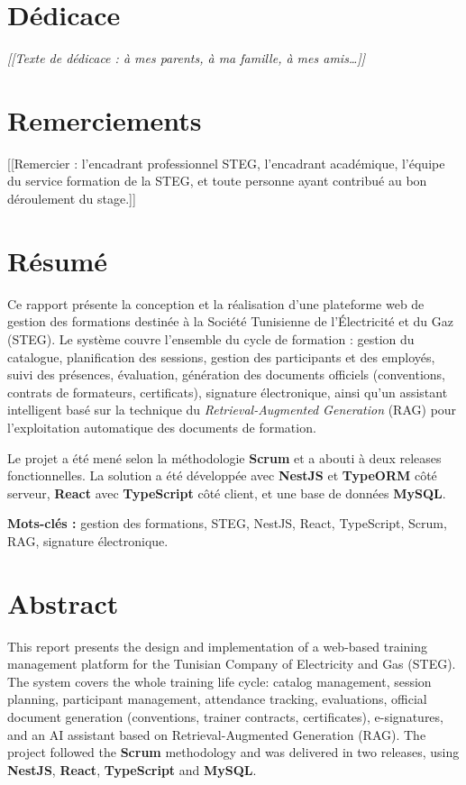 \documentclass[12pt,a4paper]{report}
\begin{document}
\chapter*{Dédicace}
\begin{flushright}
\itshape [[Texte de dédicace : à mes parents, à ma famille, à mes amis\dots]]
\end{flushright}

\chapter*{Remerciements}
[[Remercier : l'encadrant professionnel STEG, l'encadrant académique,
l'équipe du service formation de la STEG, et toute personne ayant contribué
au bon déroulement du stage.]]

\chapter*{Résumé}
Ce rapport présente la conception et la réalisation d'une plateforme web
de gestion des formations destinée à la Société Tunisienne de l'Électricité
et du Gaz (STEG). Le système couvre l'ensemble du cycle de formation :
gestion du catalogue, planification des sessions, gestion des participants
et des employés, suivi des présences, évaluation, génération des documents
officiels (conventions, contrats de formateurs, certificats), signature
électronique, ainsi qu'un assistant intelligent basé sur la technique du
\emph{Retrieval-Augmented Generation} (RAG) pour l'exploitation automatique
des documents de formation.

Le projet a été mené selon la méthodologie \textbf{Scrum} et a abouti à deux
releases fonctionnelles. La solution a été développée avec
\textbf{NestJS} et \textbf{TypeORM} côté serveur, \textbf{React} avec
\textbf{TypeScript} côté client, et une base de données \textbf{MySQL}.

\textbf{Mots-clés :} gestion des formations, STEG, NestJS, React,
TypeScript, Scrum, RAG, signature électronique.

\chapter*{Abstract}
This report presents the design and implementation of a web-based training
management platform for the Tunisian Company of Electricity and Gas (STEG).
The system covers the whole training life cycle: catalog management, session
planning, participant management, attendance tracking, evaluations, official
document generation (conventions, trainer contracts, certificates),
e-signatures, and an AI assistant based on Retrieval-Augmented Generation
(RAG). The project followed the \textbf{Scrum} methodology and was delivered
in two releases, using \textbf{NestJS}, \textbf{React}, \textbf{TypeScript}
and \textbf{MySQL}.
\end{document}
